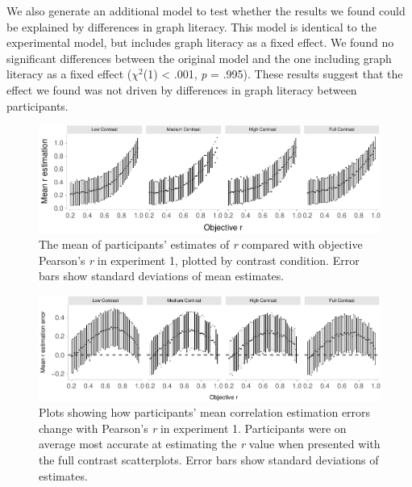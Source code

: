 \documentclass[preprint, 3p,
authoryear]{elsarticle} %
\begin{document}
We also generate an additional model to test whether the results we
found could be explained by differences in graph literacy. This model is
identical to the experimental model, but includes graph literacy as a
fixed effect. We found no significant differences between the original
model and the one including graph literacy as a fixed effect
(\(\chi^2\)(1) \textless{} .001, \emph{p} = .995). These results suggest
that the effect we found was not driven by differences in graph literacy
between participants.

\begin{figure}

{\centering \includegraphics{contrast_and_scatterplots_files/figure-latex/e1-error-plot-1} 

}

\caption{\label{e1-error-plot}The mean of participants' estimates of \textit{r} compared with objective Pearson's \textit{r} in experiment 1, plotted by contrast condition. Error bars show standard deviations of mean estimates.}\label{fig:e1-error-plot}
\end{figure}

\begin{figure}
\includegraphics[width=1\linewidth]{contrast_and_scatterplots_files/figure-latex/changes-with-r-e1-1} \caption{\label{e1-changes-plot}Plots showing how participants' mean correlation estimation errors change with Pearson's \textit{r} in experiment 1. Participants were on average most accurate at estimating the \textit{r} value when presented with the full contrast scatterplots. Error bars show standard deviations of estimates.}\label{fig:changes-with-r-e1}
\end{figure}
\end{document}

